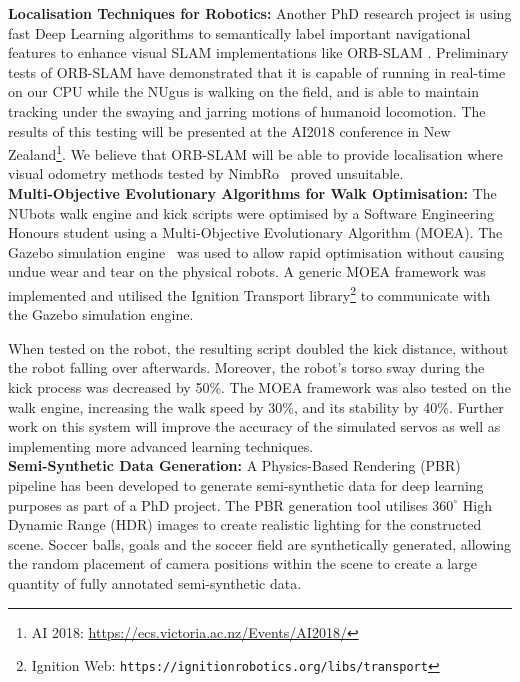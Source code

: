 \documentclass{llncs}
\begin{document}
\noindent\textbf{Localisation Techniques for Robotics:} 
Another PhD research project is using fast Deep Learning algorithms to semantically label important navigational features to enhance visual SLAM implementations like ORB-SLAM \cite{mur2015orb}. Preliminary tests of ORB-SLAM have demonstrated that it is capable of running in real-time on our CPU while the NUgus is walking on the field, and is able to maintain tracking under the swaying and jarring motions of humanoid locomotion. The results of this testing will be presented at the AI2018 conference in New Zealand\footnote{AI 2018: \url{https://ecs.victoria.ac.nz/Events/AI2018/}}. We believe that ORB-SLAM will be able to provide localisation where visual odometry methods tested by NimbRo~\cite{Nimbro2018TDP} proved unsuitable.\\

\noindent\textbf{Multi-Objective Evolutionary Algorithms for Walk Optimisation:} 
The NUbots walk engine and kick scripts were optimised by a Software Engineering Honours student using a Multi-Objective Evolutionary Algorithm (MOEA). The Gazebo simulation engine~\cite{koenig2004design} was used to allow rapid optimisation without causing undue wear and tear on the physical robots. A generic MOEA framework was implemented and utilised the Ignition Transport library\footnote{Ignition Web: \texttt{https://ignitionrobotics.org/libs/transport}} to communicate with the Gazebo simulation engine. 

When tested on the robot, the resulting script doubled the kick distance, without the robot falling over afterwards. Moreover, the robot's torso sway during the kick process was decreased by 50\%. The MOEA framework was also tested on the walk engine, increasing the walk speed by 30\%, and its stability by 40\%. Further work on this system will improve the accuracy of the simulated servos as well as implementing more advanced learning techniques.\\

\noindent\textbf{Semi-Synthetic Data Generation:} 
A Physics-Based Rendering (PBR) pipeline has been developed to generate semi-synthetic data for deep learning purposes as part of a PhD project. The PBR generation tool utilises $360^{\circ}$ High Dynamic Range (HDR) images to create realistic lighting for the constructed scene. Soccer balls, goals and the soccer field are synthetically generated, allowing the random placement of camera positions within the scene to create a large quantity of fully annotated semi-synthetic data.
\end{document}
